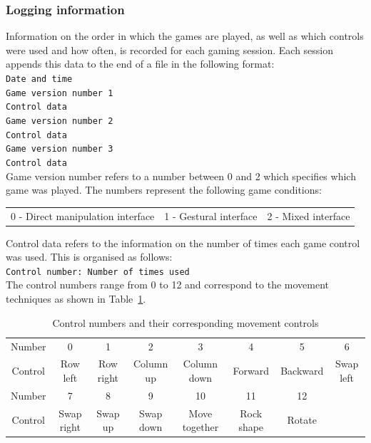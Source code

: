 \subsubsection{Logging information}
Information on the order in which the games are played, as well as which controls were used and how often, is recorded for each gaming session. Each session appends this data to the end of a file in the following format: \\
\indent \indent \texttt{Date and time} \\
\indent \indent \texttt{Game version number 1} \\
\indent \indent \texttt{Control data} \\
\indent \indent \texttt{Game version number 2} \\
\indent \indent \texttt{Control data} \\
\indent \indent \texttt{Game version number 3} \\
\indent \indent \texttt{Control data} \\
Game version number refers to a number between 0 and 2 which specifies which game was played. The numbers represent the following game conditions:
\begin{center}
\begin{tabular}{c c c}
  0 - Direct manipulation interface & 1 - Gestural interface & 2 - Mixed interface \\
\end{tabular} \end{center} 
Control data refers to the information on the number of times each game control was used. This is organised as follows: \\
\indent \indent \texttt{Control number: Number of times used} \\
The control numbers range from 0 to 12 and correspond to the movement techniques as shown in Table~\ref{controlNo}.
\begin{table}
\centering %
\begin{tabular*}{\textwidth}{c | c c c c c c c }

\hline	
  Number & 0 & 1 & 2 & 3 & 4 & 5 & 6 \\
  Control & Row left & Row right & Column up & Column down & Forward & Backward & Swap left  \\
  \hline
  Number & 7 & 8 & 9 & 10 & 11 & 12 \\
  Control & Swap right & Swap up & Swap down & Move together & Rock shape & Rotate \\
\hline  
\end{tabular*}
\caption{Control numbers and their corresponding movement controls}
\label {controlNo}
\end{table}

